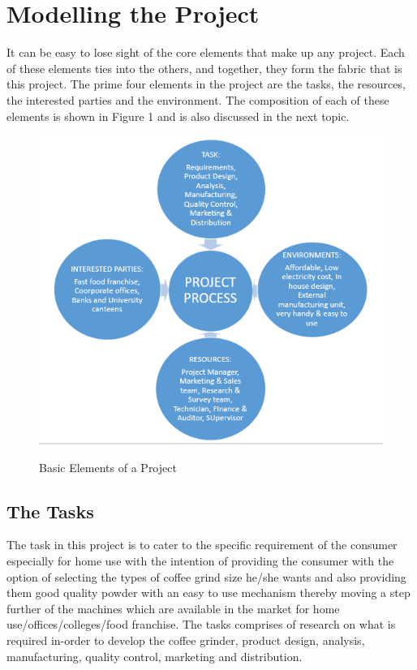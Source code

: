 \chapter*{Modelling the Project}
\noindent It can be easy to lose sight of the core elements that make up any project. Each of these elements ties into the others, and together, they form the fabric that is this project. The prime four elements in the project are the tasks, the resources, the interested parties and the environment. The composition of each of these elements is shown in Figure 1 and is also discussed in the next topic.

\begin{figure}[H]
\centering
{\includegraphics[scale=0.8]{basic.png}}
\caption{Basic Elements of a Project}
\end{figure}

\section{ The Tasks } \label{ The Tasks }
\noindent The task in this project is to cater to the specific requirement of the consumer especially for home use  with the intention of providing the consumer with the option of selecting the types of coffee grind size he/she wants and also providing them good quality powder with an easy to use mechanism thereby moving a step further of the machines which are available in the market for home use/offices/colleges/food franchise. The tasks comprises of research on what is required in-order to develop the coffee grinder, product design, analysis, manufacturing, quality control, marketing and distribution.

